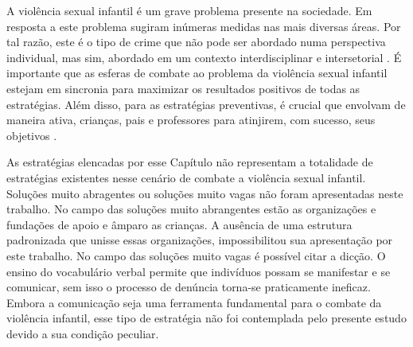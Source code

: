 \vspace{-0.35cm}

A violência sexual infantil é um grave problema presente na sociedade. Em resposta a este problema sugiram inúmeras medidas nas mais diversas áreas. Por tal razão, este é o tipo de crime que não pode ser abordado numa perspectiva individual, mas sim, abordado em um contexto interdisciplinar e intersetorial \cite{maria2010papel, pinto2017avaliaccao}. %
É importante que as esferas de combate ao problema da violência sexual infantil estejam em sincronia para maximizar os resultados positivos de todas as estratégias. Além disso, para as estratégias preventivas, é crucial que envolvam de maneira ativa, crianças, pais
e professores para atinjirem, com sucesso, seus objetivos \cite{dip2016advancing}. 




\vspace{-0.35cm}

As estratégias elencadas por esse Capítulo não representam a totalidade de estratégias existentes nesse cenário de combate a violência sexual infantil. Soluções muito abragentes ou soluções muito vagas não foram apresentadas neste trabalho. No campo das soluções muito abrangentes estão as organizações e fundações de apoio e âmparo as crianças. %
A ausência de uma estrutura padronizada que unisse essas organizações, impossibilitou sua apresentação por este trabalho. No campo das soluções muito vagas é possível citar a dicção. O ensino do vocabulário verbal permite que indivíduos possam se manifestar e se comunicar, sem isso o processo de denúncia torna-se praticamente ineficaz. Embora a comunicação seja uma ferramenta fundamental para o combate da violência infantil, esse tipo de estratégia não foi contemplada pelo presente estudo devido a sua condição peculiar. 


